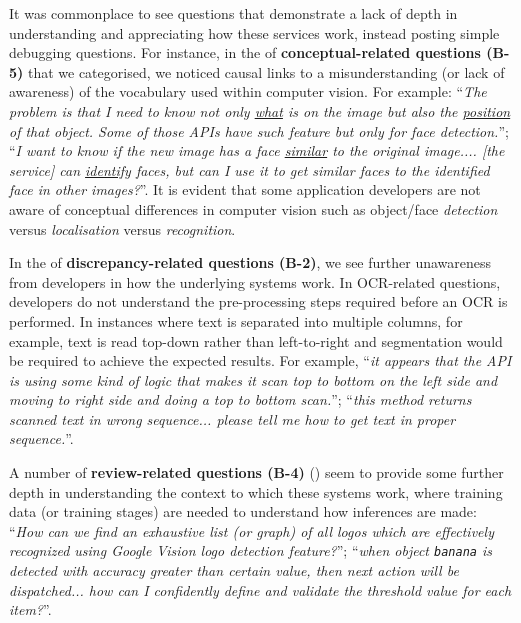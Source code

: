 It was commonplace to see questions that demonstrate a lack of depth in understanding and appreciating how these services work, instead posting simple debugging questions. For instance, in the \PctTaxBConceptual{} of \textbf{conceptual-related questions (B-5)} that we categorised, we noticed causal links to a misunderstanding (or lack of awareness) of the vocabulary used within computer vision. For example: ``\textit{The problem is that I need to know not only \underline{what} is on the image but also the \underline{position} of that object. Some of those APIs have such feature but only for face detection.}''; ``\textit{I want to know if the new image has a face \underline{similar} to the original image.... [the service] can \underline{identify} faces, but can I use it to get similar faces to the identified face in other images?}''. It is evident that some application developers are not aware of conceptual differences in computer vision such as object/face \textit{detection} versus \textit{localisation} versus \textit{recognition}. 

In the \PctTaxBDiscrepancy{} of \textbf{discrepancy-related questions (B-2)}, we see further unawareness from developers in how the underlying systems work. In OCR-related questions, developers do not understand the pre-processing steps required before an OCR is performed. In instances where text is separated into multiple columns, for example, text is read top-down rather than left-to-right and segmentation would be required to achieve the expected results. For example, ``\textit{it appears that the API is using some kind of logic that makes it scan top to bottom on the left side and moving to right side and doing a top to bottom scan.}''; ``\textit{this method returns scanned text in wrong sequence... please tell me how to get text in proper sequence.}''. 

A number of \textbf{review-related questions (B-4)} (\PctTaxBReview{}) seem to provide some further depth in understanding the context to which these systems work, where training data (or training stages) are needed to understand how inferences are made: ``\textit{How can we find an exhaustive list (or graph) of all logos which are effectively recognized using Google Vision logo detection feature?}''; ``\textit{when object \texttt{banana} is detected with accuracy greater than certain value, then next action will be dispatched... how can I confidently define and validate the threshold value for each item?}''.

